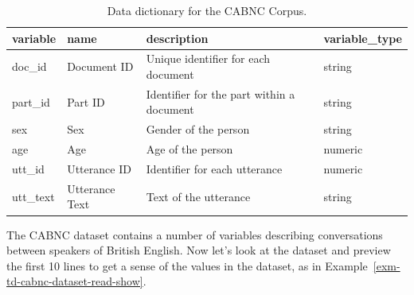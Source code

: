 \documentclass[
  letterpaper,
  DIV=11,
  numbers=noendperiod]{scrreport}
\theoremstyle{definition}
\theoremstyle{remark}
\begin{document}
\hypertarget{tbl-td-cabnc-dd}{}
\begin{table}
\caption{\label{tbl-td-cabnc-dd}Data dictionary for the CABNC Corpus. }\tabularnewline

\centering
\begin{tabular}{l|l|l|l}
\hline
variable & name & description & variable\_type\\
\hline
doc\_id & Document ID & Unique identifier for each document & string\\
\hline
part\_id & Part ID & Identifier for the part within a document & string\\
\hline
sex & Sex & Gender of the person & string\\
\hline
age & Age & Age of the person & numeric\\
\hline
utt\_id & Utterance ID & Identifier for each utterance & numeric\\
\hline
utt\_text & Utterance Text & Text of the utterance & string\\
\hline
\end{tabular}
\end{table}

The CABNC dataset contains a number of variables describing
conversations between speakers of British English. Now let's look at the
dataset and preview the first 10 lines to get a sense of the values in
the dataset, as in Example~\ref{exm-td-cabnc-dataset-read-show}.
\end{document}
